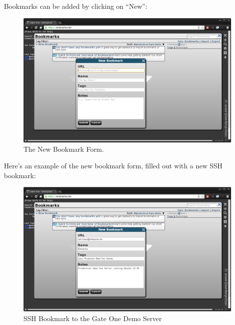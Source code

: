 \documentclass[letterpaper,10pt,openany]{sphinxmanual}
\begin{document}
Bookmarks can be added by clicking on ``New'':
\begin{figure}[htbp]
\centering
\capstart

\includegraphics{gateone_new_bookmark1.png}
\caption{The New Bookmark Form.}\end{figure}

Here's an example of the new bookmark form, filled out with a new SSH bookmark:
\begin{figure}[htbp]
\centering
\capstart

\includegraphics{gateone_new_bookmark2.png}
\caption{SSH Bookmark to the Gate One Demo Server}\end{figure}
\end{document}
